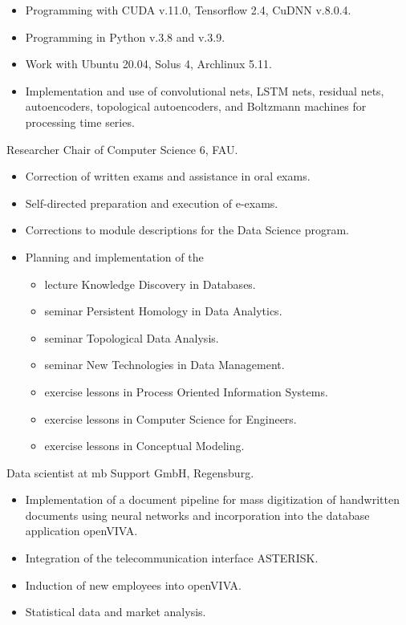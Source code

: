 \documentclass[a4paper, 11pt]{article}
\newcommand{\years}[1]{\marginnote{\scriptsize #1}}
\begin{document}
\begin{itemize}
	\item Programming with CUDA v.11.0, Tensorflow 2.4, CuDNN v.8.0.4.
	\item Programming in Python v.3.8 and v.3.9.
	\item Work with Ubuntu 20.04, Solus 4, Archlinux 5.11.
	\item Implementation and use of convolutional nets, LSTM nets, residual nets, autoencoders, topological autoencoders, and Boltzmann machines for processing time series.
\end{itemize}
\years{2018--21} Researcher Chair of Computer Science 6, FAU.
\begin{itemize}
	\item Correction of written exams and assistance in oral exams.
	\item Self-directed preparation and execution of e-exams.
	\item Corrections to module descriptions for the Data Science program.
	\item Planning and implementation of the
	      \begin{itemize}
	      	\item lecture \glqq Knowledge Discovery in Databases\grqq.
	      	\item seminar \glqq Persistent Homology in Data Analytics\grqq.
	      	\item seminar \glqq Topological Data Analysis\grqq.
	      	\item seminar \glqq New Technologies in Data Management\grqq.
	      	\item exercise lessons in \glqq Process Oriented Information Systems\grqq.
	      	\item exercise lessons in \glqq Computer Science for Engineers\grqq.
	      	\item exercise lessons in \glqq Conceptual Modeling\grqq.
	      \end{itemize}
\end{itemize}
\years{2015--18} Data scientist at mb Support GmbH, Regensburg.
\begin{itemize}
	\item Implementation of a document pipeline for mass digitization of handwritten documents using neural networks and incorporation into the database application openVIVA.
	\item Integration of the telecommunication interface ASTERISK.
	\item Induction of new employees into openVIVA.
	\item Statistical data and market analysis.
\end{itemize}
\end{document}
